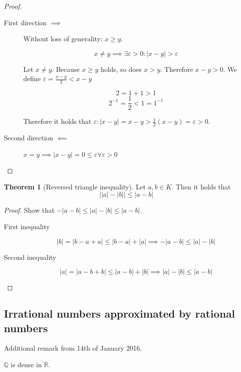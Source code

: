 \documentclass[a4paper,landscape,twocolumn]{article}
\theoremstyle{definition}
\newtheorem{theorem}{Theorem}
\newcommand\abs[1]{\left|#1\right|}
\begin{document}
\begin{proof}
  \begin{description}
    \item[First direction $\implies$]
      Without loss of generality: $x \geq y$.

      \[ x \neq y \implies \exists \varepsilon > 0: \abs{x - y} > \varepsilon \]

      Let $x \neq y$. Because $x \geq y$ holds, so does $x > y$. Therefore $x - y > 0$.
      We define $\varepsilon = \frac{x-y}{2} < x - y$

      \[ 2 = 1 + 1 > 1 \]
      \[ 2^{-1} = \frac12 < 1 = 1^{-1} \]

      Therefore it holds that $\varepsilon: \abs{x-y} = x - y > \frac12(x - y) = \varepsilon > 0$.

    \item[Second direction $\impliedby$]
      $x = y \implies \abs{x-y} = 0 \leq \varepsilon \forall \varepsilon > 0$
  \end{description}
\end{proof}

\begin{theorem}[Reversed triangle inequality]
  Let $a, b \in K$. Then it holds that
  \[ \abs{\abs{a} - \abs{b}} \leq \abs{a - b} \]
\end{theorem}

\begin{proof}
  Show that $-\abs{a - b} \leq \abs{a} - \abs{b} \leq \abs{a - b}$.
  \begin{description}
    \item[First inequality]
      \[ \abs{b} = \abs{b - a + a} \leq \abs{b - a} + \abs{a} \implies -\abs{a - b} \leq \abs{a} - \abs{b} \]
    \item[Second inequality]
      \[ \abs{a} = \abs{a - b + b} \leq \abs{a - b} + \abs{b} \implies \abs{a} - \abs{b} \leq \abs{a - b} \]
  \end{description}
\end{proof}

\subsection{Irrational numbers approximated by rational numbers}
%
Additional remark from 14th of January 2016.

$\mathbb Q$ is dense in $\mathbb R$.
\end{document}
